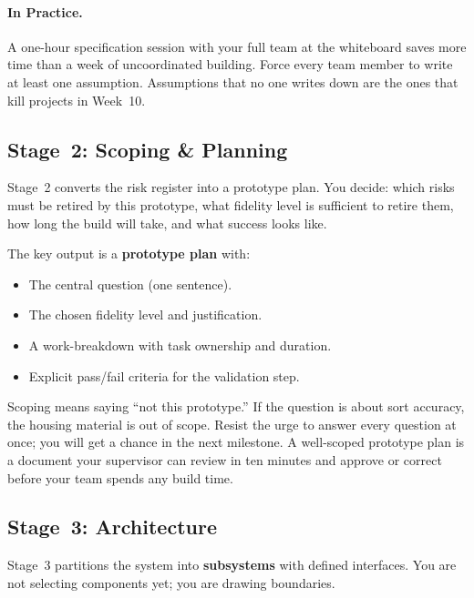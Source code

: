 \paragraph{In Practice.}
A one-hour specification session with your full team at the whiteboard saves
more time than a week of uncoordinated building.
Force every team member to write at least one assumption.
Assumptions that no one writes down are the ones that kill projects in
Week~10.

\subsection{Stage~2: Scoping \& Planning}
\label{sec:ch2-stage2}

Stage~2 converts the risk register into a prototype plan.
You decide: which risks must be retired by this prototype, what fidelity
level is sufficient to retire them, how long the build will take, and what
success looks like.

The key output is a \textbf{prototype plan} with:
\begin{itemize}
  \item The central question (one sentence).
  \item The chosen fidelity level and justification.
  \item A work-breakdown with task ownership and duration.
  \item Explicit pass/fail criteria for the validation step.
\end{itemize}

Scoping means saying ``not this prototype.''
If the question is about sort accuracy, the housing material is out of scope.
Resist the urge to answer every question at once; you will get a chance in
the next milestone.
A well-scoped prototype plan is a document your supervisor can review in
ten minutes and approve or correct before your team spends any build time.

\subsection{Stage~3: Architecture}
\label{sec:ch2-stage3}

Stage~3 partitions the system into \textbf{subsystems} with
defined interfaces.
You are not selecting components yet; you are drawing boundaries.

